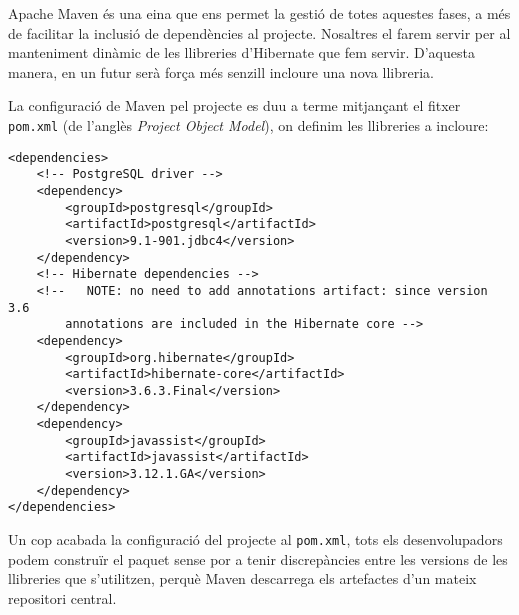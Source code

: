 Apache Maven és una eina que ens permet la gestió de totes aquestes fases, a més de facilitar la inclusió de dependències al projecte. Nosaltres el farem servir per al manteniment dinàmic de les llibreries d'Hibernate que fem servir. D'aquesta manera, en un futur serà força més senzill incloure una nova llibreria.

La configuració de Maven pel projecte es duu a terme mitjançant el fitxer \texttt{pom.xml} (de l'anglès \emph{Project Object Model}), on definim les llibreries a incloure:

\begin{verbatim}
<dependencies>
    <!-- PostgreSQL driver -->
    <dependency>
        <groupId>postgresql</groupId>
        <artifactId>postgresql</artifactId>
        <version>9.1-901.jdbc4</version>
    </dependency>
    <!-- Hibernate dependencies -->
    <!--   NOTE: no need to add annotations artifact: since version 3.6
        annotations are included in the Hibernate core -->
    <dependency>
        <groupId>org.hibernate</groupId>
        <artifactId>hibernate-core</artifactId>
        <version>3.6.3.Final</version>
    </dependency>
    <dependency>
        <groupId>javassist</groupId>
        <artifactId>javassist</artifactId>
        <version>3.12.1.GA</version>
    </dependency>
</dependencies>
\end{verbatim}

Un cop acabada la configuració del projecte al \texttt{pom.xml}, tots els desenvolupadors podem construïr el paquet sense por a tenir discrepàncies entre les versions de les llibreries que s'utilitzen, perquè Maven descarrega els artefactes d'un mateix repositori central.